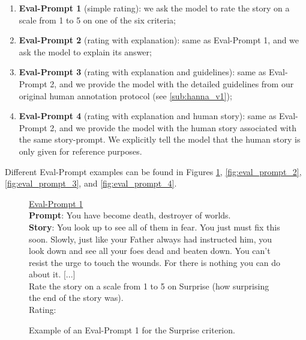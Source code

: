 \begin{enumerate}
    \item \textbf{Eval-Prompt 1} (simple rating): we ask the model to rate the story on a scale from 1 to 5 on one of the six criteria;
    \item \textbf{Eval-Prompt 2} (rating with explanation): same as Eval-Prompt 1, and we ask the model to explain its answer;
    \item \textbf{Eval-Prompt 3} (rating with explanation and guidelines): same as Eval-Prompt 2, and we provide the model with the detailed guidelines from our original human annotation protocol (see \autoref{sub:hanna_v1});
    \item \textbf{Eval-Prompt 4} (rating with explanation and human story): same as Eval-Prompt 2, and we provide the model with the human story associated with the same story-prompt. We explicitly tell the model that the human story is only given for reference purposes.
\end{enumerate}

Different Eval-Prompt examples can be found in Figures \ref{fig:eval_prompt_1}, \ref{fig:eval_prompt_2}, \ref{fig:eval_prompt_3}, and \ref{fig:eval_prompt_4}.

\begin{figure}[h!]
    \begin{framed}
    \underline{Eval-Prompt 1}\\
    
    \noindent \textbf{Prompt}: You have become death, destroyer of worlds.\\
    
    \noindent \textbf{Story}: You look up to see all of them in fear. You just must fix this soon. Slowly, just like your Father always had instructed him, you look down and see all your foes dead and beaten down. You can't resist the urge to touch the wounds. For there is nothing you can do about it. [...]\\
    
    Rate the story on a scale from 1 to 5 on Surprise (how surprising the end of the story was).\\
    
    Rating:
    \end{framed}
    \caption{Example of an Eval-Prompt 1 for the Surprise criterion.}
    \label{fig:eval_prompt_1}
\end{figure}

